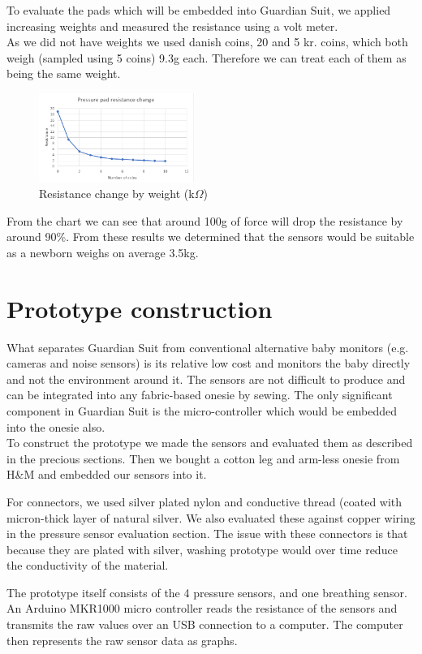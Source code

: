 \documentclass{sigchi-ext}
\begin{document}
To evaluate the pads which will be embedded into Guardian Suit, we applied 
increasing weights and measured the resistance using a volt meter.\\
As we did not have weights we used danish coins, 20 and 5 kr. coins, which both
weigh (sampled using 5 coins) 9.3g each. Therefore we can treat each of them as
being the same weight.
\begin{figure} [H]
   \centering \includegraphics[width=0.45\textwidth]{img/chart.PNG}
    \caption{Resistance change by weight (k$\Omega$)}
\end{figure}
From the chart we can see that around 100g of force will drop the resistance
by around 90\%. From these results we determined that the sensors would be suitable
as a newborn weighs on average 3.5kg.

\clearpage

\section{Prototype construction}
What separates Guardian Suit from conventional alternative baby monitors 
(e.g. cameras and noise sensors) is its relative low cost and monitors the
baby directly and not the environment around it. The 
sensors are not difficult to produce and can be integrated into any fabric-based
onesie by sewing. The only significant component in Guardian Suit is the
micro-controller which would be embedded into the onesie also.\\
To construct the prototype we made the sensors and evaluated them as
described in the precious sections. Then we bought a cotton leg and arm-less
onesie from H\&M and embedded our sensors into it.

For connectors, we used silver plated nylon and conductive thread (coated with
micron-thick layer of natural silver. We also evaluated these against copper
wiring in the pressure sensor evaluation section. The issue with these
connectors is that because they are plated with silver, washing prototype
would over time reduce the conductivity of the material.

The prototype itself consists of the 4 pressure sensors, and one breathing sensor. 
An Arduino MKR1000 micro controller reads the resistance of the sensors and transmits the raw values over an USB connection to a computer. The computer then represents the raw sensor data as graphs.
\end{document}
